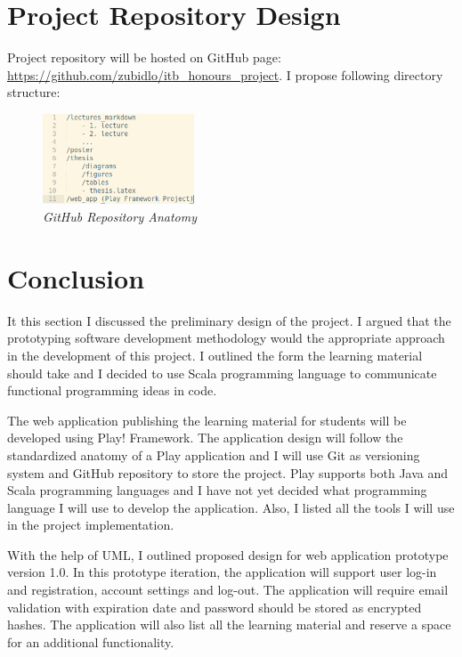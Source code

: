 \documentclass[12pt,twoside,a4paper]{report}
\begin{document}
\section{Project Repository Design}\label{3.10}
Project repository will be hosted on GitHub page: \url{https://github.com/zubidlo/itb_honours_project}.
I propose following directory structure:

\begin{figure}[!ht]
	\centering
		\includegraphics[width=0.4\textwidth, totalheight=4cm]
		{github_repo_anatomy}
	\caption{\textit{GitHub Repository Anatomy}}
	\label{f3.10}
\end{figure}


\section{Conclusion}\label{3.11}
It this section I discussed the preliminary design of the project. I argued that the prototyping software development methodology would the appropriate approach in the development of this project. I outlined the form the learning material should take and I decided to use Scala programming language to communicate functional programming ideas in code.

The web application publishing the learning material for students will be developed using Play! Framework. The application design will follow the standardized anatomy of a Play application and I will use Git as versioning system and GitHub repository to store the project. Play supports both Java and Scala programming languages and I have not yet decided what programming language I will use to develop the application. Also, I listed all the tools I will use in the project implementation.

With the help of UML, I outlined proposed design for web application prototype version 1.0. In this prototype iteration, the application will support user log-in and registration, account settings and log-out. The application will require email validation with expiration date and password should be stored as encrypted hashes. The application will also list all the learning material and reserve a space for an additional functionality.
\end{document}
